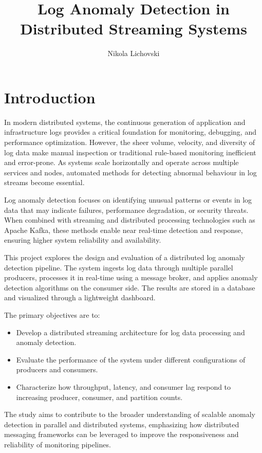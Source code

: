 \documentclass[12pt,a4paper]{report}
\title{Log Anomaly Detection in Distributed Streaming Systems}
\author{Nikola Lichovski}
\date{}
\begin{document}
\maketitle
\tableofcontents

\chapter{Introduction}

In modern distributed systems, the continuous generation of application and infrastructure logs provides a critical foundation for monitoring, debugging, and performance optimization. However, the sheer volume, velocity, and diversity of log data make manual inspection or traditional rule-based monitoring inefficient and error-prone. As systems scale horizontally and operate across multiple services and nodes, automated methods for detecting abnormal behaviour in log streams become essential.

Log anomaly detection focuses on identifying unusual patterns or events in log data that may indicate failures, performance degradation, or security threats. When combined with streaming and distributed processing technologies such as Apache Kafka, these methods enable near real-time detection and response, ensuring higher system reliability and availability.

This project explores the design and evaluation of a distributed log anomaly detection pipeline. The system ingests log data through multiple parallel producers, processes it in real-time using a message broker, and applies anomaly detection algorithms on the consumer side. The results are stored in a database and visualized through a lightweight dashboard.

The primary objectives are to:
\begin{itemize}
  \item Develop a distributed streaming architecture for log data processing and anomaly detection.
  \item Evaluate the performance of the system under different configurations of producers and consumers.
  \item Characterize how throughput, latency, and consumer lag respond to increasing producer, consumer, and partition counts.
\end{itemize}

The study aims to contribute to the broader understanding of scalable anomaly detection in parallel and distributed systems, emphasizing how distributed messaging frameworks can be leveraged to improve the responsiveness and reliability of monitoring pipelines.
\end{document}
